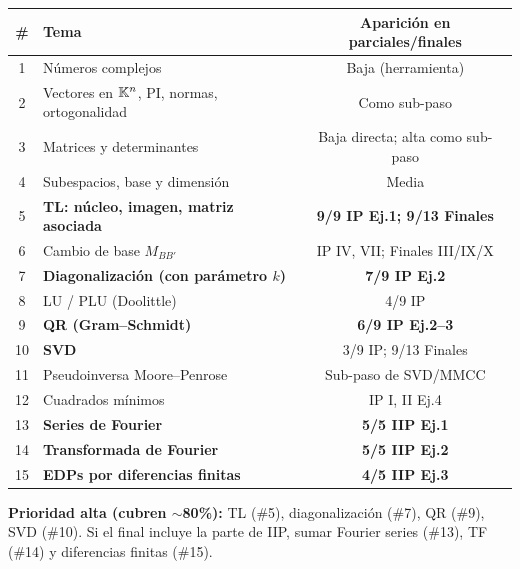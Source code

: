 \begin{center}\small
\begin{tabular}{clc}
\toprule
\# & Tema & Aparición en parciales/finales \\
\midrule
1 & Números complejos & Baja (herramienta) \\
2 & Vectores en $\mathbb{K}^n$, PI, normas, ortogonalidad & Como sub-paso \\
3 & Matrices y determinantes & Baja directa; alta como sub-paso \\
4 & Subespacios, base y dimensión & Media \\
5 & \textbf{TL: núcleo, imagen, matriz asociada} & \textbf{9/9 IP Ej.1; 9/13 Finales} \\
6 & Cambio de base $M_{BB'}$ & IP IV, VII; Finales III/IX/X \\
7 & \textbf{Diagonalización (con parámetro $k$)} & \textbf{7/9 IP Ej.2} \\
8 & LU / PLU (Doolittle) & 4/9 IP \\
9 & \textbf{QR (Gram--Schmidt)} & \textbf{6/9 IP Ej.2--3} \\
10 & \textbf{SVD} & 3/9 IP; 9/13 Finales \\
11 & Pseudoinversa Moore--Penrose & Sub-paso de SVD/MMCC \\
12 & Cuadrados mínimos & IP I, II Ej.4 \\
13 & \textbf{Series de Fourier} & \textbf{5/5 IIP Ej.1} \\
14 & \textbf{Transformada de Fourier} & \textbf{5/5 IIP Ej.2} \\
15 & \textbf{EDPs por diferencias finitas} & \textbf{4/5 IIP Ej.3} \\
\bottomrule
\end{tabular}
\end{center}

\noindent\textbf{Prioridad alta (cubren $\sim$80\%):} TL (\#5), diagonalización (\#7), QR (\#9), SVD (\#10). Si el final incluye la parte de IIP, sumar Fourier series (\#13), TF (\#14) y diferencias finitas (\#15).

